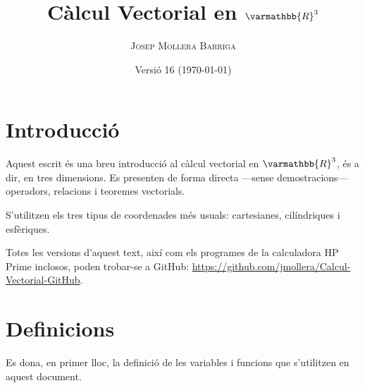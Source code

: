 \documentclass[catalan,a4paper,twoside,11pt]{article}
\begin{document}
\title{Càlcul Vectorial en $\varmathbb{R}^3$}
\author{\textsc{Josep Mollera Barriga}}
\date{Versió 16 (\today)}
\maketitle


\section{Introducció}

Aquest escrit és una breu introducció al càlcul vectorial en $\varmathbb{R}^3$, és a dir, en tres dimensions. Es presenten de forma directa ---sense demostracions--- operadors, relacions i teoremes vectorials.

S'utilitzen els tres tipus de coordenades més usuals:  cartesianes, 
cilíndriques i esfèriques.

Totes les versions d'aquest text, així com els programes de la calculadora \textsf{HP Prime} inclosos, poden trobar-se a GitHub: \href{https://github.com/jmollera/Calcul-Vectorial-GitHub}{https:/\!\!/github.com/jmollera/Calcul-Vectorial-GitHub}.


\section{Definicions}

Es dona, en primer lloc, la definició de les variables i funcions que s'utilitzen en aquest document.
\end{document}
